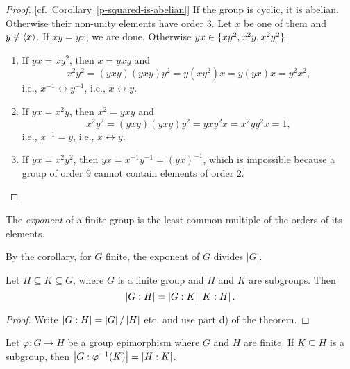 \begin{proof} {[cf.~Corollary~\ref{p-squared-is-abelian}]} If the group is cyclic, it is abelian. Otherwise their non-unity elements have order $3$. Let $x$ be one of them and $y\notin\langle x\rangle$. If $xy=yx$, we are done. Otherwise $yx\in\{xy^2, x^2y,x^2y^2\}$.
\begin{enumerate}[$\to$]
    \item If $yx=xy^2$, then $x=yxy$ and
    $$
        x^2y^2=(yxy)(yxy)y^2= y(xy^2)x=y(yx)x=y^2x^2,
    $$
    i.e., $x^{-1}\leftrightarrow y^{-1}$, i.e., $x\leftrightarrow y$.
    
    \item If $yx=x^2y$, then $x^2=yxy$ and
    $$
        x^2y^2= (yxy)(yxy)y^2= yxy^2x=x^2yy^2x=1,
    $$
    i.e., $x^{-1}=y$, i.e., $x\leftrightarrow y$.

    \item If $yx=x^2y^2$, then $yx=x^{-1}y^{-1}=(yx)^{-1}$, which is impossible because a group of order $9$ cannot contain elements of order $2$.
\end{enumerate}
\end{proof}


\begin{defn}
    The \textsl{exponent} of a finite group is the least common multiple of the orders of its elements.
\end{defn}

\begin{rem}
     By the corollary, for\/ $G$ finite, the exponent of\/ $G$ divides $|G|$.
\end{rem}

\begin{cor}\label{group-index-product}
    Let $H \subseteq K \subseteq G$, where $G$ is a finite group and\/ $H$ and\/ $K$ are subgroups. Then 
    $$
        \left\vert{G:H}\right\vert = \left\vert{G:K}\right\vert\left\vert{K:H}\right\vert.
    $$
\end{cor}
\begin{proof} Write $\left\vert{G:H}\right\vert=\left\vert{G}\right\vert/\left\vert{H}\right\vert$ etc. and use part d) of the theorem.  \end{proof}

\begin{cor}\label{index-of-preimage}
    Let $\varphi\colon G\to H$ be a group epimorphism where $G$ and $H$ are finite. If\/ $K\subseteq H$ is a subgroup, then $\left\vert{G:\varphi^{-1}(K)}\right\vert=\left\vert{H:K}\right\vert$.
\end{cor}

